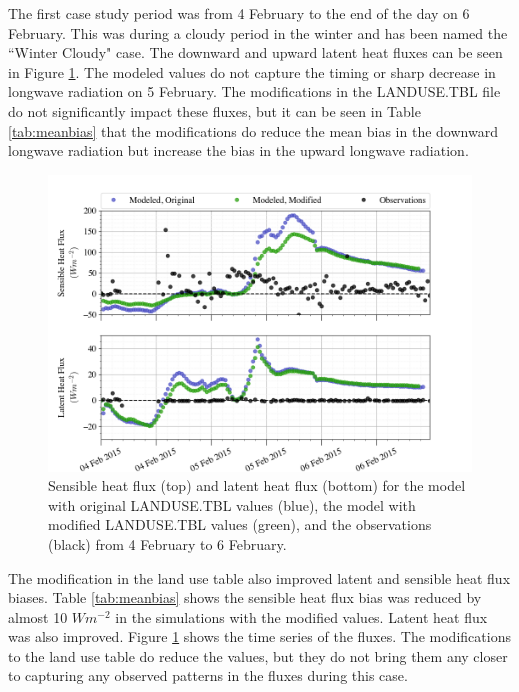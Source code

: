The first case study period was from 4 February to the end of the day on 6 February. This was during a cloudy period in the winter and has been named the ``Winter Cloudy" case. The downward and upward latent heat fluxes can be seen in Figure \ref{fig:c1:heat}. The modeled values do not capture the timing or sharp decrease in longwave radiation on 5 February. The modifications in the LANDUSE.TBL file do not significantly impact these fluxes, but it can be seen in Table \ref{tab:meanbias} that the modifications do reduce the mean bias in the downward longwave radiation but increase the bias in the upward longwave radiation. 

\begin{figure}[h]
    \centering
    \includegraphics[width=1\linewidth]{figures/chapter6/case1_sensible_latent.png}
    \caption[Idealized Case 1 - Latent and sensible heat fluxes.]{Sensible heat flux (top) and latent heat flux (bottom) for the model with original LANDUSE.TBL values (blue), the model with modified LANDUSE.TBL values (green), and the observations (black) from 4 February to 6 February.}
    \label{fig:c1:heat}
\end{figure}

The modification in the land use table also improved latent and sensible heat flux biases. Table \ref{tab:meanbias} shows the sensible heat flux bias was reduced by almost 10 $Wm^{-2}$ in the simulations with the modified values. Latent heat flux was also improved. Figure \ref{fig:c1:heat} shows the time series of the fluxes. The modifications to the land use table do reduce the values, but they do not bring them any closer to capturing any observed patterns in the fluxes during this case.

